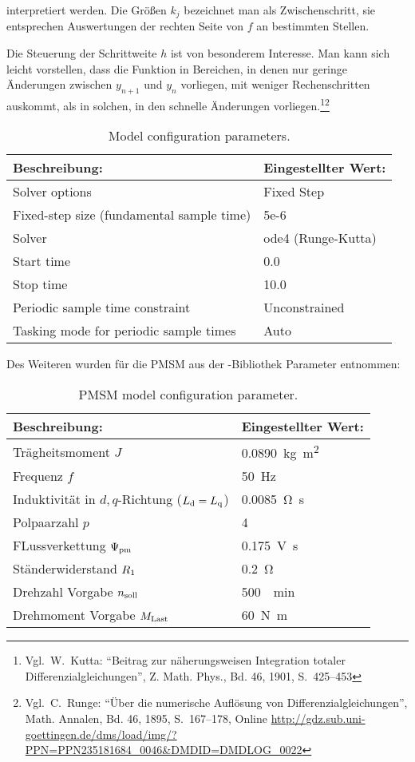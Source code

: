 interpretiert werden.
Die Größen $k_j$ bezeichnet man als Zwischenschritt, sie entsprechen Auswertungen der rechten Seite von $f$ an bestimmten Stellen.

Die Steuerung der Schrittweite $h$ ist von besonderem Interesse.
Man kann sich leicht vorstellen, dass die Funktion in Bereichen, in denen nur geringe Änderungen zwischen $y_{n+1}$ und $y_n$ vorliegen, mit weniger Rechenschritten auskommt, als in solchen, in den schnelle Änderungen vorliegen.\footnote{Vgl.~W.\ Kutta: \enquote{Beitrag zur näherungsweisen Integration totaler Differenzialgleichungen}, Z. Math. Phys., Bd. 46, 1901, S.~425--453}\footnote{Vgl.~C.\ Runge: \enquote{Über die numerische Auflösung von Differenzialgleichungen}, Math. Annalen, Bd. 46, 1895, S.~167--178, Online \url{http://gdz.sub.uni-goettingen.de/dms/load/img/?PPN=PPN235181684_0046&DMDID=DMDLOG_0022}}


\begin{table}[h!]
	\centering
	\caption{Model configuration parameters.}
	\label{tab:model-parameter}
	\begin{tabularx}{0.8\textwidth}{ll}
		\toprule
		Beschreibung: & Eingestellter Wert: \\
		\midrule
		Solver options	& Fixed Step\\
		Fixed-step size (fundamental sample time)	& 5e-6 \\
		Solver	& ode4 (Runge-Kutta) \\
		Start time & 0.0 \\
		Stop time & 10.0\\
		Periodic sample time constraint & Unconstrained \\
		Tasking mode for periodic sample times & Auto \\
		\bottomrule
	\end{tabularx}
\end{table}

Des Weiteren wurden für die PMSM aus der -Bibliothek Parameter entnommen:

\begin{table}[h!]
	\centering
	\caption{PMSM model configuration parameter.}
	\label{tab:pmsm-parameter}
	\begin{tabularx}{0.8\textwidth}{ll}
		\toprule
		Beschreibung: & Eingestellter Wert: \\
		\midrule
		Trägheitsmoment $J$ & \SI{0.0890}{\kilogram\square\meter} \\
		Frequenz $f$ & \SI{50}{\hertz}\\
		Induktivität in $d,q$-Richtung ($L_{\mathrm{d}}=L_{\mathrm{q}}$) & \SI{0.0085}{\ohm\second}\\
		Polpaarzahl $p$ & 4 \\
		FLussverkettung $\Psi_{\mathrm{pm}}$ & \SI{0.175}{\volt\second}\\
		Ständerwiderstand $R_{\mathrm{1}}$ & \SI{0.2}{\ohm}\\
		Drehzahl Vorgabe $n_{\mathrm{soll}}$ & \SI{500}{\per\minute}\\
		Drehmoment Vorgabe $M_{\mathrm{Last}}$ & \SI{60}{\newton\meter}\\
		\bottomrule
	\end{tabularx}
\end{table}

